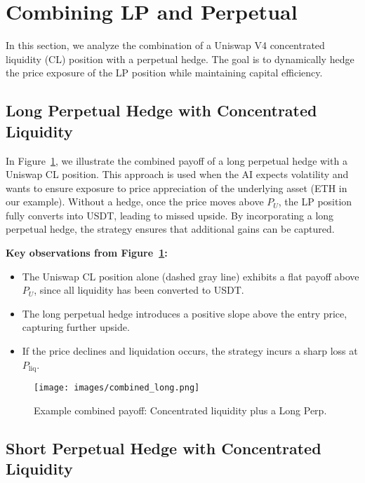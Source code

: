 \documentclass[12pt]{article}
\begin{document}
\section{Combining LP and Perpetual}
\label{sec:fiveway}

In this section, we analyze the combination of a Uniswap V4 concentrated liquidity (CL) position with a perpetual hedge. The goal is to dynamically hedge the price exposure of the LP position while maintaining capital efficiency. \\

\medskip

\subsection{Long Perpetual Hedge with Concentrated Liquidity}

In Figure~\ref{fig:combined-long}, we illustrate the combined payoff of a long perpetual hedge with a Uniswap CL position. This approach is used when the AI expects volatility and wants to ensure exposure to price appreciation of the underlying asset (ETH in our example). Without a hedge, once the price moves above $P_U$, the LP position fully converts into USDT, leading to missed upside. By incorporating a long perpetual hedge, the strategy ensures that additional gains can be captured.

\medskip

\textbf{Key observations from Figure~\ref{fig:combined-long}:}
\begin{itemize}
    \item The Uniswap CL position alone (dashed gray line) exhibits a flat payoff above $P_U$, since all liquidity has been converted to USDT.
    \item The long perpetual hedge introduces a positive slope above the entry price, capturing further upside.
    \item If the price declines and liquidation occurs, the strategy incurs a sharp loss at $P_{\mathrm{liq}}$.
\end{itemize}

\begin{figure}[htb]
    \centering
    \texttt{[image: images/combined\_long.png]}
    \caption{Example combined payoff: Concentrated liquidity plus a Long Perp.}
    \label{fig:combined-long}
\end{figure}

\subsection{Short Perpetual Hedge with Concentrated Liquidity}
\end{document}
